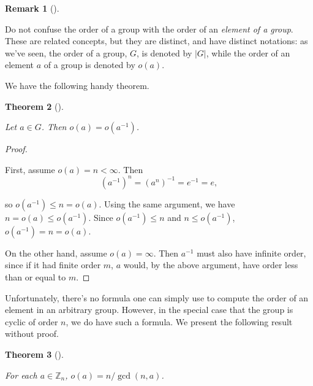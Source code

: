\documentclass[10pt,]{book}
\theoremstyle{plain}
\newtheorem{theorem}{Theorem}[section]
\theoremstyle{definition}
\theoremstyle{definition}
\newtheorem{remark}[theorem]{Remark}
\theoremstyle{definition}
\theoremstyle{definition}
\numberwithin{equation}{section}
\def\Z{\mathbb{Z}}
\newcommand{\lt}{ < }
\begin{document}
\begin{remark}[]\label{remark-22}

      Do not confuse the order of a group with the order
      of an \emph{element of a group}. These are related concepts, but they are distinct, and have distinct
      notations: as we've seen, the order of a group, \(G\), is denoted by
      \(|G|\), while the order of an element \(a\) of a group is denoted by
      \(o(a)\).
\end{remark}
\par

    We have the following handy theorem.
\begin{theorem}[{}]\label{invord}

        Let \(a\in G\). Then \(o(a)=o(a^{-1})\).
\end{theorem}
\begin{proof}\hypertarget{proof-24}{}

      First, assume \(o(a)=n\lt \infty\). Then
\begin{equation*}

        (a^{-1})^n=(a^n)^{-1}=e^{-1}=e,
      
\end{equation*}

      so \(o(a^{-1})\leq n=o(a)\). Using the same argument, we have \(n=o(a)\leq o(a^{-1})\). Since \(o(a^{-1})\leq n\) and \(n\leq o(a^{-1})\), \(o(a^{-1})=n=o(a)\).
\par

      On the other hand, assume \(o(a)= \infty\). Then \(a^{-1}\) must also have infinite order, since if it had finite order \(m\), \(a\) would, by the above argument, have order less than or equal to \(m\).
\end{proof}
\par

    Unfortunately, there's no formula one can simply use to compute the order
    of an element in an arbitrary group. However, in the special case
    that the group is cyclic of order \(n\), we do have such a formula. We
    present the following result without proof.
\begin{theorem}[{}]\label{znorders}

        For each \(a\in \Z_n\), \(o(a)=n/\gcd(n,a)\).
\end{theorem}
\par
\end{document}
